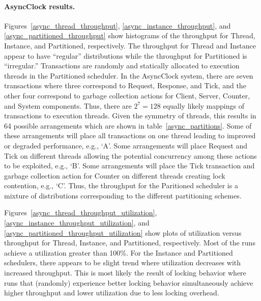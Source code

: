 \paragraph{AsyncClock results.}
Figures~\ref{async_thread_throughput}, \ref{async_instance_throughput}, and \ref{async_partitioned_throughput} show histograms of the throughput for Thread, Instance, and Partitioned, respectively.
The throughput for Thread and Instance appear to have ``regular'' distributions while the throughput for Partitioned is ``irregular.''
Transactions are randomly and statically allocated to execution threads in the Partitioned scheduler.
In the AsyncClock system, there are seven transactions where three correspond to Request, Response, and Tick, and the other four correspond to garbage collection actions for Client, Server, Counter, and System components.
Thus, there are $2^7 = 128$ equally likely mappings of transactions to execution threads.
Given the symmetry of threads, this results in 64 possible arrangements which are shown in table~\ref{async_partitions}.
Some of these arrangements will place all transactions on one thread leading to improved or degraded performance, e.g., `A'.
Some arrangements will place Request and Tick on different threads allowing the potential concurrency among these actions to be exploited, e.g., `B'.
Some arrangements will place the Tick transaction and garbage collection action for Counter on different threads creating lock contention, e.g., `C'.
Thus, the throughput for the Paritioned scheduler is a mixture of distributions corresponding to the different partitioning schemes.

Figures~\ref{async_thread_throughput_utilization}, \ref{async_instance_throughput_utilization}, and \ref{async_partitioned_throughput_utilization} show plots of utilization versus throughput for Thread, Instance, and Partitioned, respectively.
Most of the runs achieve a utilization greater than 100\%.
For the Instance and Partitioned schedulers, there appears to be slight trend where utilization decreases with increased throughput.
This is most likely the result of locking behavior where runs that (randomly) experience better locking behavior simultaneously achieve higher throughput and lower utilization due to less locking overhead.

